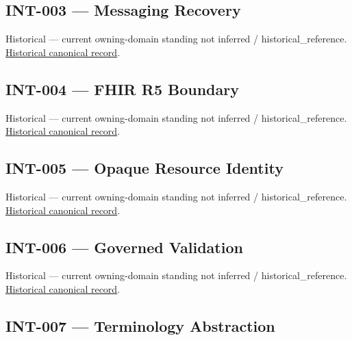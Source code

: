\subsection{INT-003 — Messaging Recovery}

\par\label{element:6e72cf09e7cc4acf9466dd39e1a15ae6}
Historical — current owning-domain standing not inferred / historical\_reference. \href{../../../../continuum/motivation/requirement/6e72cf09e7cc4acf9466dd39e1a15ae6.md}{Historical canonical record}.\par

\subsection{INT-004 — FHIR R5 Boundary}

\par\label{element:927b0cf4710e424391120b124067051e}
Historical — current owning-domain standing not inferred / historical\_reference. \href{../../../../continuum/motivation/requirement/927b0cf4710e424391120b124067051e.md}{Historical canonical record}.\par

\subsection{INT-005 — Opaque Resource Identity}

\par\label{element:91bd7a8732b3468b84be2493103433e7}
Historical — current owning-domain standing not inferred / historical\_reference. \href{../../../../continuum/motivation/requirement/91bd7a8732b3468b84be2493103433e7.md}{Historical canonical record}.\par

\subsection{INT-006 — Governed Validation}

\par\label{element:6c14251b5d4e4eff96d2fd812834d124}
Historical — current owning-domain standing not inferred / historical\_reference. \href{../../../../continuum/motivation/requirement/6c14251b5d4e4eff96d2fd812834d124.md}{Historical canonical record}.\par

\subsection{INT-007 — Terminology Abstraction}


